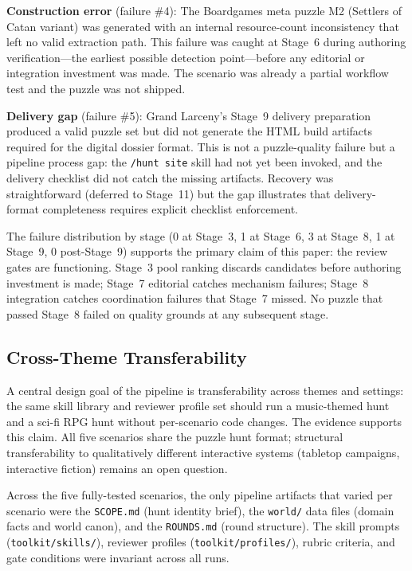 \textbf{Construction error} (failure \#4): The Boardgames meta puzzle M2 (Settlers of Catan variant) was generated with an internal resource-count inconsistency that left no valid extraction path. This failure was caught at Stage~6 during authoring verification---the earliest possible detection point---before any editorial or integration investment was made. The scenario was already a partial workflow test and the puzzle was not shipped.

\textbf{Delivery gap} (failure \#5): Grand Larceny's Stage~9 delivery preparation produced a valid puzzle set but did not generate the HTML build artifacts required for the digital dossier format. This is not a puzzle-quality failure but a pipeline process gap: the \texttt{/hunt site} skill had not yet been invoked, and the delivery checklist did not catch the missing artifacts. Recovery was straightforward (deferred to Stage~11) but the gap illustrates that delivery-format completeness requires explicit checklist enforcement.

The failure distribution by stage (0 at Stage~3, 1 at Stage~6, 3 at Stage~8, 1 at Stage~9, 0 post-Stage~9) supports the primary claim of this paper: the review gates are functioning. Stage~3 pool ranking discards candidates before authoring investment is made; Stage~7 editorial catches mechanism failures; Stage~8 integration catches coordination failures that Stage~7 missed. No puzzle that passed Stage~8 failed on quality grounds at any subsequent stage.

\subsection{Cross-Theme Transferability}
\label{sec:transferability}

A central design goal of the pipeline is transferability across themes and settings: the same skill library and reviewer profile set should run a music-themed hunt and a sci-fi RPG hunt without per-scenario code changes. The evidence supports this claim. All five scenarios share the puzzle hunt format; structural transferability to qualitatively different interactive systems (tabletop campaigns, interactive fiction) remains an open question.

Across the five fully-tested scenarios, the only pipeline artifacts that varied per scenario were the \texttt{SCOPE.md} (hunt identity brief), the \texttt{world/} data files (domain facts and world canon), and the \texttt{ROUNDS.md} (round structure). The skill prompts (\texttt{toolkit/skills/}), reviewer profiles (\texttt{toolkit/profiles/}), rubric criteria, and gate conditions were invariant across all runs.

